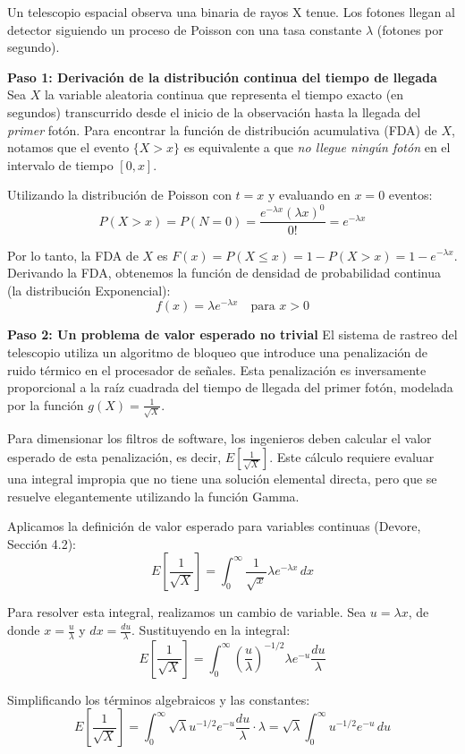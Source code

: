 Un telescopio espacial observa una binaria de rayos X tenue. Los fotones llegan al detector siguiendo un proceso de Poisson con una tasa constante $\lambda$ (fotones por segundo). 

\textbf{Paso 1: Derivación de la distribución continua del tiempo de llegada}
Sea $X$ la variable aleatoria continua que representa el tiempo exacto (en segundos) transcurrido desde el inicio de la observación hasta la llegada del \textit{primer} fotón. Para encontrar la función de distribución acumulativa (FDA) de $X$, notamos que el evento $\{X > x\}$ es equivalente a que \textit{no llegue ningún fotón} en el intervalo de tiempo $[0, x]$. 

Utilizando la distribución de Poisson con $t = x$ y evaluando en $x = 0$ eventos:
$$ P(X > x) = P(N = 0) = \frac{e^{-\lambda x} (\lambda x)^0}{0!} = e^{-\lambda x} $$

Por lo tanto, la FDA de $X$ es $F(x) = P(X \le x) = 1 - P(X > x) = 1 - e^{-\lambda x}$. 
Derivando la FDA, obtenemos la función de densidad de probabilidad continua (la distribución Exponencial):
$$ f(x) = \lambda e^{-\lambda x} \quad \text{para } x > 0 $$

\textbf{Paso 2: Un problema de valor esperado no trivial}
El sistema de rastreo del telescopio utiliza un algoritmo de bloqueo que introduce una penalización de ruido térmico en el procesador de señales. Esta penalización es inversamente proporcional a la raíz cuadrada del tiempo de llegada del primer fotón, modelada por la función $g(X) = \frac{1}{\sqrt{X}}$. 

Para dimensionar los filtros de software, los ingenieros deben calcular el valor esperado de esta penalización, es decir, $E\left[\frac{1}{\sqrt{X}}\right]$. Este cálculo requiere evaluar una integral impropia que no tiene una solución elemental directa, pero que se resuelve elegantemente utilizando la función Gamma.

Aplicamos la definición de valor esperado para variables continuas (Devore, Sección 4.2):
$$ E\left[\frac{1}{\sqrt{X}}\right] = \int_{0}^{\infty} \frac{1}{\sqrt{x}} \lambda e^{-\lambda x} \, dx $$

Para resolver esta integral, realizamos un cambio de variable. Sea $u = \lambda x$, de donde $x = \frac{u}{\lambda}$ y $dx = \frac{du}{\lambda}$. Sustituyendo en la integral:
$$ E\left[\frac{1}{\sqrt{X}}\right] = \int_{0}^{\infty} \left(\frac{u}{\lambda}\right)^{-1/2} \lambda e^{-u} \frac{du}{\lambda} $$

Simplificando los términos algebraicos y las constantes:
$$ E\left[\frac{1}{\sqrt{X}}\right] = \int_{0}^{\infty} \sqrt{\lambda} u^{-1/2} e^{-u} \frac{du}{\lambda} \cdot \lambda = \sqrt{\lambda} \int_{0}^{\infty} u^{-1/2} e^{-u} \, du $$

